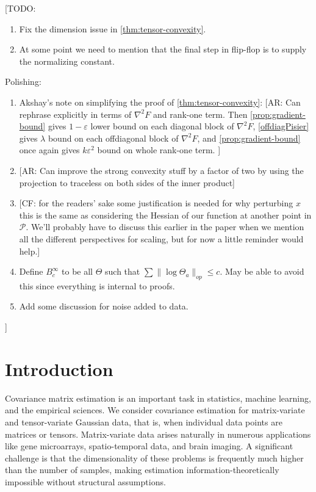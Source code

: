 \documentclass[aos]{imsart}
\theoremstyle{definition}
\numberwithin{equation}{section}
\newcommand{\eps}{\varepsilon}
\newcommand{\SPD}{\mathcal{P}}
\newcommand{\samp}{x}
\newcommand{\CF}[1]{{\color{purple}[CF: #1]}}
\newcommand{\AR}[1]{{\color{orange}[AR: #1]}}
\newcommand{\TODO}[1]{{\color{blue}[TODO: #1]}}
\begin{document}
\TODO{
\begin{enumerate}
\item Fix the dimension issue in \cref{thm:tensor-convexity}.
\item At some point we need to mention that the final step in flip-flop is to supply the normalizing constant.
\end{enumerate}
Polishing:
\begin{enumerate}
\item Akshay's note on simplifying the proof of \cref{thm:tensor-convexity}: \AR{Can rephrase explicitly in terms of $\nabla^{2} F$ and rank-one term. Then \cref{prop:gradient-bound} gives $1-\eps$ lower bound on each diagonal block of $\nabla^{2} F$, \cref{offdiagPisier} gives $\lambda$ bound on each offdiagonal block of $\nabla^{2} F$, and \cref{prop:gradient-bound} once again gives $k \eps^{2}$ bound on whole rank-one term.  }
\item \AR{Can improve the strong convexity stuff by a factor of two by using the projection to traceless on both sides of the inner product}
\item \CF{for the readers' sake some justification is needed for why perturbing $\samp$ this is the same as considering the Hessian of our function at another point in $\SPD$. We'll probably have to discuss this earlier in the paper when we mention all the different perspectives for scaling, but for now a little reminder would help.}
\item Define $B^\infty_c$ to be all $\Theta$ such that $\sum \|\log \Theta_a\|_{op} \leq c$. May be able to avoid this since everything is internal to proofs.
\item Add some discussion for noise added to data.
\end{enumerate}
}


\section{Introduction}
Covariance matrix estimation is an important task in statistics, machine learning, and the empirical sciences.
We consider covariance estimation for matrix-variate and tensor-variate Gaussian data, that is, when individual data points are matrices or tensors. Matrix-variate data arises naturally in numerous applications like gene microarrays, spatio-temporal data, and brain imaging.
A significant challenge is that the dimensionality of these problems is frequently much higher than the number of samples, making estimation information-theoretically impossible without structural assumptions.
\end{document}
